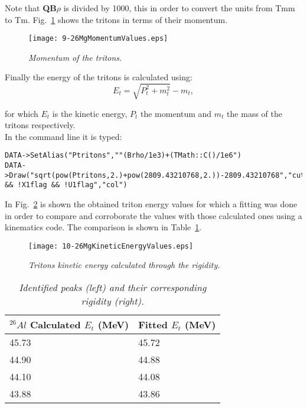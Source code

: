 \documentclass[11pt]{report}
\begin{document}
\noindent
Note that \textbf{QB$\rho$} is divided by 1000, this in order to convert the units 
from Tmm to Tm. Fig.~\ref{fig:26MgMomentumValues} shows the tritons in terms of their momentum.

\begin{figure}[h]
 \begin{center}
\texttt{[image: 9-26MgMomentumValues.eps]}  
 \end{center}
\vspace*{-4mm}
\caption{\label{fig:26MgMomentumValues} \it Momentum of the tritons.}
\end{figure}
\vspace*{4mm}

\noindent
Finally the energy of the tritons is calculated using:
\begin{equation}
E_{t}=\sqrt{P_{t}^{2}+m_{t}^{2}}-m_{t},
\end{equation}

\noindent
for which $E_{t}$ is the kinetic energy, $P_{t}$ the momentum 
and $m_{t}$ the mass of the tritons respectively.\\

\noindent
In the command line it is typed:
\begin{verbatim}
DATA->SetAlias("Ptritons",""(Brho/1e3)+(TMath::C()/1e6")
DATA->Draw("sqrt(pow(Ptritons,2.)+pow(2809.43210768,2.))-2809.43210768","cutTritonsMg && !X1flag && !U1flag","col")
\end{verbatim}

\noindent
In Fig.~\ref{fig:26MgKineticEnergyValues} is shown the obtained triton energy values 
for which a fitting was done in order to compare and corroborate the values with those 
calculated ones using a kinematics code. The comparison is shown in Table~\ref{tab:Tenergies}.

\begin{figure}[h]
 \begin{center}
\texttt{[image: 10-26MgKineticEnergyValues.eps]}  
 \end{center}
\vspace*{-4mm}
\caption{\label{fig:26MgKineticEnergyValues} \it Tritons kinetic energy calculated through the rigidity.}
\end{figure}
\vspace*{4mm}

\begin{table}[!th]
\centering
\begin{tabular}{|l|l|}
\hline
$^{26}Al$ Calculated $E_{t}$ (MeV)&Fitted $E_{t}$ (MeV) \\
\hline
45.73&45.72\\
44.90&44.88\\
44.10&44.08\\
43.88&43.86\\
\hline
\end{tabular}
\caption{\it Identified peaks (left) and their corresponding rigidity (right).}
\label{tab:Tenergies}
\end{table}
\end{document}
